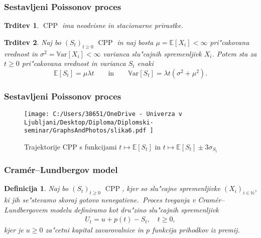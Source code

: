 \documentclass[handout]{beamer} %
\theoremstyle{plain}
\newtheorem{definicija}{Definicija}
\newtheorem{trditev}{Trditev}
\newcommand{\N}{\mathbb{N}}
\newcommand{\E}{\mathbb{E}}
\newcommand{\Var}[1]{\text{$\mathbb{V}\!\mathrm{ar}$}\left[#1\right]}
\DeclareMathOperator{\CPP}{CPP}
\begin{document}
\begin{frame}
  \frametitle{Sestavljeni Poissonov proces}
  \begin{trditev}
    $\CPP$ ima neodvisne in stacionarne prirastke.
  \end{trditev}
  \pause
  \begin{trditev}
    Naj bo $(S_t)_{t\geq 0}$ $\CPP$ in naj bosta $\mu = \mathbb{E}\left[X_i\right] < \infty$ 
    pri"cakovana vrednost in $\sigma^2= \Var{X_i} <\infty$ varianca
    slu"cajnih spremenljivk $X_i$. Potem sta za $t\geq0$ pri"cakovana vrednost in 
    varianca $S_t$ enaki 
    \begin{equation*}
        \E\left[S_t\right] = \mu\lambda t \qquad \text{in} \qquad \Var{S_t} = \lambda t\left(\sigma^2 + \mu^2\right).
    \end{equation*}
    \label{trd:PricVarCPP}
  \end{trditev}
\end{frame}

\begin{frame}
  \frametitle{Sestavljeni Poissonov proces}
  \begin{figure}[H]
    \centering
    \texttt{[image: 
        C:/Users/38651/OneDrive - Univerza v Ljubljani/Desktop/Diploma/Diplomski-seminar/GraphsAndPhotos/slika6.pdf
        ]}
    \caption{Trajektorije CPP s funkcijami $t \mapsto \E\left[S_t\right]$ in $t \mapsto \E\left[S_t\right] \pm 3\sigma_{S_t}$}
    \label{fig:slika1}
\end{figure}
\end{frame}

\begin{frame}
  \frametitle{Cramér--Lundbergov model}
  \begin{definicija}
    Naj bo $(S_t)_{t\geq0 }$ $\CPP$, kjer so slu"cajne spremenljivke $(X_i)_{i\in\N}$, 
    ki jih se"stevamo skoraj gotovo nenegativne.\ \textit{Proces tveganja} v Cramér--Lundbergovem 
    modelu definiramo kot dru"zino slu"cajnih spremenljivk 
    \begin{align*}
        U_t = u + p(t) - S_t, \quad t\geq0,
    \end{align*}
    kjer je $u \geq 0$ za"cetni kapital zavarovalnice in $p$ funkcija prihodkov iz premij. 
    \label{def:procesTveganja}
  \end{definicija}
\end{frame}
\end{document}
